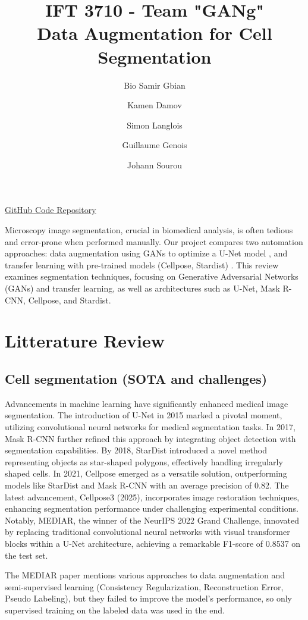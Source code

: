 \documentclass[]{article}
\title{\textbf{IFT 3710 - Team "GANg"} \\ 
\textbf{Data Augmentation for Cell Segmentation}}
\author[1]{Bio Samir Gbian}
\author[1]{Kamen Damov}
\author[1]{Simon Langlois}
\author[1]{Guillaume Genois}
\author[1]{Johann Sourou}
\affil{Departement of Computer Science and Operations Research}
\affil[1]{University of Montreal}
\begin{document}
\maketitle

\href{https://github.com/KamenDamov/IFT3710-Advanced-Project-in-ML-AI}{GitHub Code Repository}

Microscopy image segmentation, crucial in biomedical analysis, is often tedious and error-prone when performed manually. Our project compares two automation approaches: data augmentation using GANs to optimize a U-Net model \cite{majurski2020cell}, and transfer learning with pre-trained models (Cellpose, Stardist) \cite{park2022use}. This review examines segmentation techniques, focusing on Generative Adversarial Networks (GANs) and transfer learning, as well as architectures such as U-Net, Mask R-CNN, Cellpose, and Stardist.

\section{Litterature Review}
\subsection{Cell segmentation (SOTA and challenges)}

Advancements in machine learning have significantly enhanced medical image segmentation. The introduction of U-Net in 2015 marked a pivotal moment, utilizing convolutional neural networks for medical segmentation tasks. In 2017, Mask R-CNN further refined this approach by integrating object detection with segmentation capabilities. By 2018, StarDist introduced a novel method representing objects as star-shaped polygons, effectively handling irregularly shaped cells. In 2021, Cellpose emerged as a versatile solution, outperforming models like StarDist and Mask R-CNN with an average precision of 0.82. The latest advancement, Cellpose3 (2025), incorporates image restoration techniques, enhancing segmentation performance under challenging experimental conditions. Notably, MEDIAR, the winner of the NeurIPS 2022 Grand Challenge, innovated by replacing traditional convolutional neural networks with visual transformer blocks within a U-Net architecture, achieving a remarkable F1-score of 0.8537 on the test set.

The MEDIAR paper \cite{pmlr-v212-lee23a} mentions various approaches to data augmentation and semi-supervised learning (Consistency Regularization, Reconstruction Error, Pseudo Labeling), but they failed to improve the model's performance, so only supervised training on the labeled data was used in the end.
\end{document}
